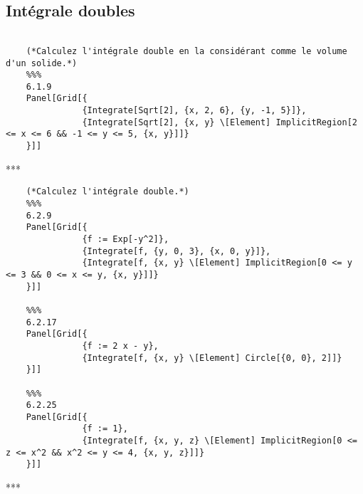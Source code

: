 	\subsection{Intégrale doubles}
	\begin{verbatim}
	
	(*Calculez l'intégrale double en la considérant comme le volume d'un solide.*)
	%%%
	6.1.9
	Panel[Grid[{
	           {Integrate[Sqrt[2], {x, 2, 6}, {y, -1, 5}]},
	           {Integrate[Sqrt[2], {x, y} \[Element] ImplicitRegion[2 <= x <= 6 && -1 <= y <= 5, {x, y}]]}
	}]]
	\end{verbatim}
	\begin{center}***\end{center}
	\begin{verbatim}
	(*Calculez l'intégrale double.*)
	%%%
	6.2.9
	Panel[Grid[{
	           {f := Exp[-y^2]},
	           {Integrate[f, {y, 0, 3}, {x, 0, y}]},
	           {Integrate[f, {x, y} \[Element] ImplicitRegion[0 <= y <= 3 && 0 <= x <= y, {x, y}]]}
	}]]

	%%%
	6.2.17
	Panel[Grid[{
	           {f := 2 x - y},
	           {Integrate[f, {x, y} \[Element] Circle[{0, 0}, 2]]}
	}]]
	
	%%%
	6.2.25
	Panel[Grid[{
	           {f := 1},
	           {Integrate[f, {x, y, z} \[Element] ImplicitRegion[0 <= z <= x^2 && x^2 <= y <= 4, {x, y, z}]]}
	}]]
	\end{verbatim}
	\begin{center}***\end{center}
